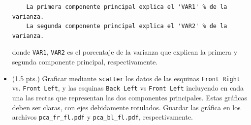 \documentclass[11pt,letterpaper]{exam}
\begin{document}
\begin{questions}
\begin{itemize}
\begin{verbatim}
	La primera componente principal explica el 'VAR1' % de la varianza.
	La segunda componente principal explica el 'VAR2' % de la varianza.
\end{verbatim}

donde \verb'VAR1', \verb'VAR2' es el porcentaje de la varianza que explican la primera y segunda componente principal, respectivamente.

\item (1.5 pts.) Graficar mediante \verb'scatter' los datos de las esquinas \verb'Front Right' vs. \verb'Front Left', y las esquinas \verb'Back Left' vs \verb'Front Left' incluyendo en cada una las rectas que representan las dos componentes principales. Estas gr\'aficas deben ser claras, con ejes debidamente rotulados. Guardar las gr\'afica en los archivos \verb'pca_fr_fl.pdf' y \verb'pca_bl_fl.pdf', respectivamente.
\end{itemize}

\end{questions}
\end{document}
